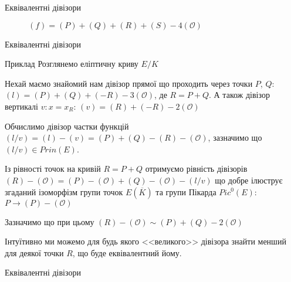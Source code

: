 \documentclass[9pt]{beamer}
\begin{document}
\begin{darkframes}
\begin{frame}{Еквівалентні дівізори}
\begin{figure}
\caption{$(f) = (P) + (Q) + (R)+(S)-4(\mathcal{O})$}
\end{figure}
    
\end{frame}
\begin{frame}{Еквівалентні дівізори}
    \begin{exampleblock}{Приклад}
        Розглянемо еліптичну криву $E/K$
        
        Нехай маємо знайомий нам дівізор прямої що проходить через точки $P$, $Q$: $(l)=(P)+(Q)+(-R)-3(\mathcal{O})$, де $R=P+Q$. А також дівізор вертикалі $v: x=x_R$: $(v) = (R) + (-R) - 2(\mathcal{O})$

        Обчислимо дівізор частки функцій $(l/v) = (l) - (v) = (P) + (Q)-(R)-(\mathcal{O})$, зазначимо що $(l/v) \in Prin(E)$.

        Із рівності точок на кривій $R=P+Q$ отримуємо рівність дівізорів $(R)-(\mathcal{O}) = (P)-(\mathcal{O}) +
(Q)-(\mathcal{O})-(l/v)$ що добре ілюструє згаданий ізоморфізм групи точок $E(\overline{K})$ та групи Пікарда $Pic^0(E)$: $P\to(P)-(\mathcal{O})$

    Зазначимо що при цьому $(R)-(\mathcal{O}) \sim (P) +(Q)-2(\mathcal{O})$

    \end{exampleblock}
    Інтуїтивно ми можемо для будь якого <<великого>> дівізора знайти менший для деякої точки $R$, що буде еквівалентний йому.
\end{frame}
\begin{frame}{Еквівалентні дівізори}
\begin{center}
\end{center}
\end{frame}
\end{darkframes}
\end{document}
